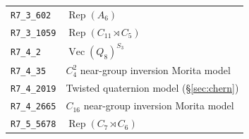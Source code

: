 \begin{table}[H]
\begin{tabular}{@{}l l@{}}
\texttt{R7\_3\_602} & $\operatorname{Rep}(A_6)$\\
\texttt{R7\_3\_1059} & $\operatorname{Rep}(C_{11}\rtimes C_5)$\\
\texttt{R7\_4\_2} & $\operatorname{Vec}(Q_8)^{S_3}$\\
\texttt{R7\_4\_35} & $C_4^2$ near-group inversion Morita model\\
\texttt{R7\_4\_2019} & Twisted quaternion model (\S\ref{sec:chern})\\
\texttt{R7\_4\_2665} & $C_{16}$ near-group inversion Morita model\\
\texttt{R7\_5\_5678} & $\operatorname{Rep}(C_7\rtimes C_6)$\\
\bottomrule
\end{tabular}
\end{table}
